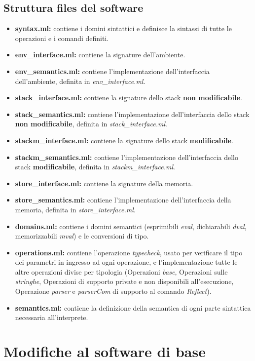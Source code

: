 \documentclass[a4paper,titlepage]{book}
\begin{document}
\section{Struttura files del software}
\begin{itemize}
\item \textbf{syntax.ml:} contiene i domini sintattici e definisce la sintassi di tutte le operazioni e i comandi definiti.
\item \textbf{env\_interface.ml:} contiene la signature dell'ambiente.
\item \textbf{env\_semantics.ml:} contiene l'implementazione dell'interfaccia dell'ambiente, definita in \textit{env\_interface.ml}.
\item \textbf{stack\_interface.ml:} contiene la signature dello stack \textbf{non modificabile}.
\item \textbf{stack\_semantics.ml:} contiene l'implementazione dell'interfaccia dello stack \textbf{non modificabile}, definita in \textit{stack\_interface.ml}.
\item \textbf{stackm\_interface.ml:} contiene la signature dello stack \textbf{modificabile}.
\item \textbf{stackm\_semantics.ml:} contiene l'implementazione dell'interfaccia dello stack \textbf{modificabile}, definita in \textit{stackm\_interface.ml}.
\item \textbf{store\_interface.ml:} contiene la signature della memoria.
\item \textbf{store\_semantics.ml:} contiene l'implementazione dell'interfaccia della memoria, definita in \textit{store\_interface.ml}.
\item \textbf{domains.ml:} contiene i domini semantici (esprimibili \textit{eval}, dichiarabili \textit{dval}, memorizzabili \textit{mval}) e le conversioni di tipo.
\item \textbf{operations.ml:} contiene l'operazione \textit{typecheck}, usato per verificare il tipo dei parametri in ingresso ad ogni operazione, e l'implementazione tutte le altre operazioni divise per tipologia (Operazioni \textit{base}, Operazioni sulle \textit{stringhe}, Operazioni di supporto private e non disponibili all'esecuzione, Operazione \textit{parser} e \textit{parserCom} di supporto al comando \textit{Reflect}).
\item \textbf{semantics.ml:} contiene la definizione della semantica di ogni parte sintattica necessaria all'interprete.
\end{itemize}

\chapter{Modifiche al software di base}
\end{document}
